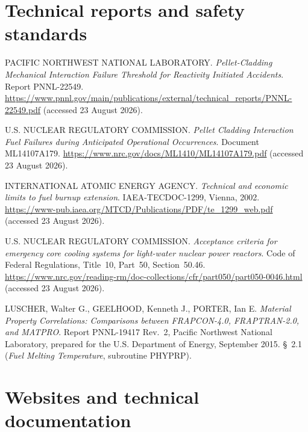 \section*{Technical reports and safety standards}

\begin{list}{}{\setlength{\leftmargin}{1cm}\setlength{\itemindent}{-1cm}}

\item[{[7]}]
PACIFIC NORTHWEST NATIONAL LABORATORY.
\textit{Pellet-Cladding Mechanical Interaction Failure Threshold for Reactivity
Initiated Accidents}. Report PNNL-22549.
\url{https://www.pnnl.gov/main/publications/external/technical_reports/PNNL-22549.pdf}
(accessed 23 August 2026).

\item[{[8]}]
U.S. NUCLEAR REGULATORY COMMISSION.
\textit{Pellet Cladding Interaction Fuel Failures during Anticipated
Operational Occurrences}. Document ML14107A179.
\url{https://www.nrc.gov/docs/ML1410/ML14107A179.pdf}
(accessed 23 August 2026).

\item[{[9]}]
INTERNATIONAL ATOMIC ENERGY AGENCY.
\textit{Technical and economic limits to fuel burnup extension}.
IAEA-TECDOC-1299, Vienna, 2002.
\url{https://www-pub.iaea.org/MTCD/Publications/PDF/te_1299_web.pdf}
(accessed 23 August 2026).

\item[{[10]}]
U.S. NUCLEAR REGULATORY COMMISSION.
\textit{Acceptance criteria for emergency core cooling systems for light-water
nuclear power reactors}. Code of Federal Regulations, Title~10, Part~50,
Section~50.46.
\url{https://www.nrc.gov/reading-rm/doc-collections/cfr/part050/part050-0046.html}
(accessed 23 August 2026).

\item[{[11]}]
LUSCHER, Walter G., GEELHOOD, Kenneth J., PORTER, Ian E.
\textit{Material Property Correlations: Comparisons between FRAPCON-4.0,
FRAPTRAN-2.0, and MATPRO}. Report PNNL-19417 Rev.~2, Pacific Northwest
National Laboratory, prepared for the U.S. Department of Energy, September 2015.
\S~2.1 (\textit{Fuel Melting Temperature}, subroutine PHYPRP).

\end{list}

\section*{Websites and technical documentation}


